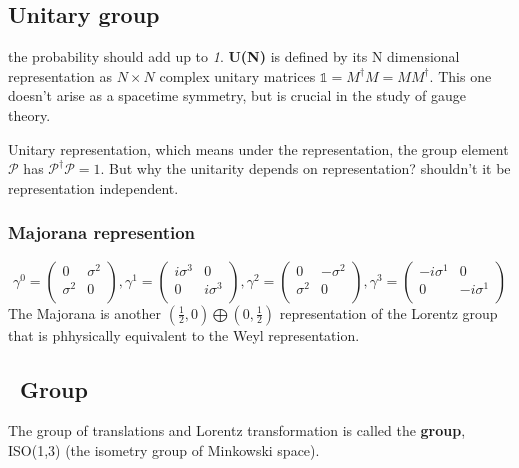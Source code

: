 \subsection{Unitary group} 
the probability should add up to \emph{1}.
\textbf{U(N)} is defined by its N dimensional representation as $N\times N$
complex unitary matrices $\mathds{1} = M^{\dag}M = MM^{\dag}$. This one
doesn't arise as a spacetime symmetry, but is crucial in the study of gauge
theory. 

Unitary representation, which means under the representation, the group
element $\mathcal{P}$ has $\mathcal{P}^\dag\mathcal{P}=1$. But why the
unitarity depends on representation? shouldn't it be representation
independent.

\subsubsection{Majorana represention}
\begin{equation}
    \gamma^{0} = 
    \begin{pmatrix}
	0   &	\sigma^2    \\
	\sigma^2    & 0     \\
    \end{pmatrix},
    \gamma^{1} = 
    \begin{pmatrix}
	i\sigma^3    & 0     \\
	0   &	i\sigma^3    \\
    \end{pmatrix},
    \gamma^{2} = 
    \begin{pmatrix}
	0   &	-\sigma^2    \\
	\sigma^2    & 0     \\
    \end{pmatrix},
    \gamma^{3} = 
    \begin{pmatrix}
	-i\sigma^1    & 0     \\
	0   &	-i\sigma^1    \\
    \end{pmatrix}
\end{equation}
The Majorana is another $(\frac{1}{2}, 0)\bigoplus (0, \frac{1}{2})$
representation of the Lorentz group that is phhysically equivalent to the
Weyl representation.
\subsection{\Poincare \ Group} 
The group of translations and Lorentz transformation is called the
\textbf{\Poincare{} group}, 
ISO(1,3) (the isometry group of Minkowski space).

